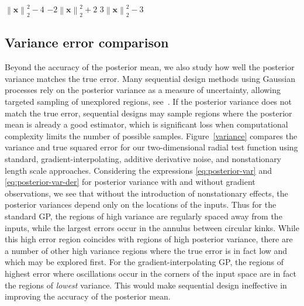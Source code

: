 \documentclass{article}
\newcommand{\norm}[1]{\left\lVert#1\right\rVert}
\renewcommand{\vec}[1]{\mathbf{#1}}
\numberwithin{equation}{section}
\begin{document}
\begin{algorithm}
    \captionsetup{justification=centering}
    \begin{algorithmic}
    \IF{$g_1(\vec{x}) \geq 0$}
        \RETURN $\norm{\vec{x}}_2^2 - 4$
    \ELSIF{$g_2(\vec{x}) \geq 0$}
        \RETURN $-2\norm{\vec{x}}_2^2 + 2$
    \ELSE
        \RETURN $3\norm{\vec{x}}_2^2 - 3$
    \ENDIF
    \end{algorithmic}
    \caption{: $g_1(\vec{x}) = \norm{\vec{x}}_2^2 - 2$, $g_2(\vec{x}) = \norm{\vec{x}}_2^2 - 1$}
	\label{radial-code}
\end{algorithm}

\subsection{Variance error comparison}
Beyond the accuracy of the posterior mean, we also study how well the posterior variance matches the true error. Many sequential design methods using Gaussian processes rely on the posterior variance as a measure of uncertainty, allowing targeted sampling of unexplored regions, see~\cite{jones1998efficient, ranjan2008sequential}. If the posterior variance does not match the true error, sequential designs may sample regions where the posterior mean is already a good estimator, which is significant loss when computational complexity limits the number of possible samples. Figure~\ref{variance} compares the variance and true squared error for our two-dimensional radial test function using standard, gradient-interpolating, additive derivative noise, and nonstationary length scale approaches. Considering the expressions \eqref{eq:posterior-var} and \eqref{eq:posterior-var-der} for posterior variance with and without gradient observations, we see that without the introduction of nonstationary effects, the posterior variances depend only on the locations of the inputs. Thus for the standard GP, the regions of high variance are regularly spaced away from the inputs, while the largest errors occur in the annulus between circular kinks. While this high error region coincides with regions of high posterior variance, there are a number of other high variance regions where the true error is in fact low and which may be explored first. For the gradient-interpolating GP, the regions of highest error where oscillations occur in the corners of the input space are in fact the regions of \textit{lowest} variance. This would make sequential design ineffective in improving the accuracy of the posterior mean.
\end{document}
